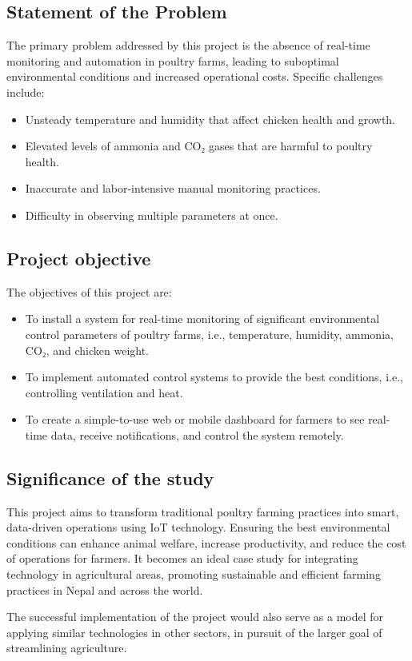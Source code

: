 \documentclass[../main.tex]{subfiles}
\begin{document}
\subsection{Statement of the Problem}
The primary problem addressed by this project is the absence of real-time monitoring and automation in poultry farms, leading to suboptimal environmental conditions and increased operational costs. Specific challenges include:
\begin{itemize}
\item Unsteady temperature and humidity that affect chicken health and growth.

\item Elevated levels of ammonia and CO₂ gases that are harmful to poultry health.

\item Inaccurate and labor-intensive manual monitoring practices.

\item Difficulty in observing multiple parameters at once.
\end{itemize}
\subsection{Project objective}
The objectives of this project are:
\begin{itemize}
    \item To install a system for real-time monitoring of significant environmental control parameters of poultry farms, i.e., temperature, humidity, ammonia, CO₂, and chicken weight.
   \item To implement automated control systems to provide the best conditions, i.e., controlling ventilation and heat.
   \item To create a simple-to-use web or mobile dashboard for farmers to see real-time data, receive notifications, and control the system remotely.
\end{itemize}
\subsection{Significance of the study}
This project aims to transform traditional poultry farming practices into smart, data-driven operations using IoT technology. Ensuring the best environmental conditions can enhance animal welfare, increase productivity, and reduce the cost of operations for farmers. It becomes an ideal case study for integrating technology in agricultural areas, promoting sustainable and efficient farming practices in Nepal and across the world.

The successful implementation of the project would also serve as a model for applying similar technologies in other  sectors, in pursuit of the larger goal of streamlining agriculture.
\end{document}
